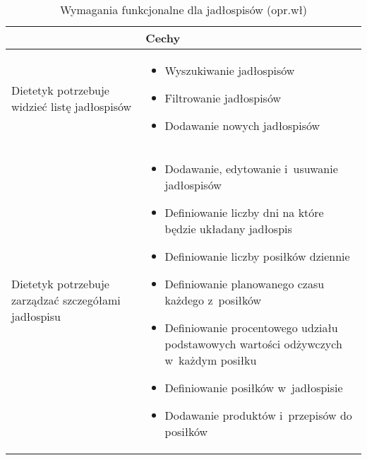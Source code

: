\begin{minipage}{\textwidth}
    \begin{table}[H]
        \centering\caption{Wymagania funkcjonalne dla jadłospisów (opr.wł)\label{tabela:wymaganiaFunkcjonalneJadlospisy}}
        \begin{tabular}{|P{.3\textwidth}|P{.6\textwidth}|}
            \hline
             & Cechy \\

            \hline
            Dietetyk potrzebuje widzieć listę jadłospisów &
            \begin{itemize}
                \item Wyszukiwanie jadłospisów
                \item Filtrowanie jadłospisów
                \item Dodawanie nowych jadłospisów
            \end{itemize} \\
            \hline
            Dietetyk potrzebuje zarządzać szczegółami jadłospisu &
            \begin{itemize}
                \item Dodawanie, edytowanie i~usuwanie jadłospisów
                \item Definiowanie liczby dni na które będzie układany jadłospis
                \item Definiowanie liczby posiłków dziennie
                \item Definiowanie planowanego czasu każdego z~posiłków
                \item Definiowanie procentowego udziału podstawowych wartości odżywczych w~każdym posiłku
                \item Definiowanie posiłków w~jadłospisie
                \item Dodawanie produktów i~przepisów do posiłków
            \end{itemize} \\
            \hline
        \end{tabular}
    \end{table}
\end{minipage}

